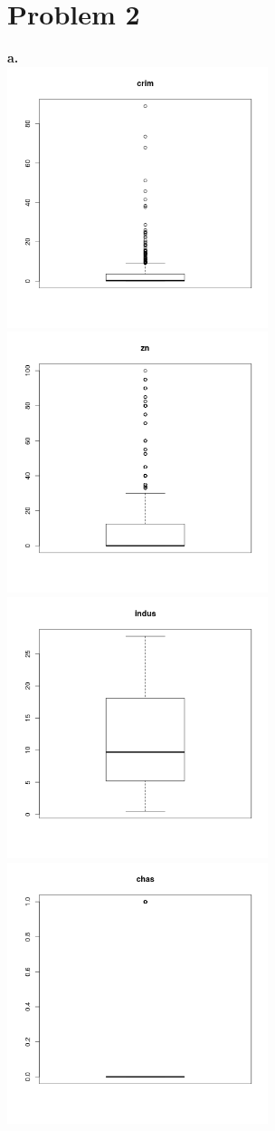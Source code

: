 \message{ !name(hw1.tex)}\documentclass{article}
\begin{document}
\section{Problem 2}
\textbf{a.}\\
\includegraphics[width=3in]{1.png}
\includegraphics[width=3in]{2.png}
\includegraphics[width=3in]{3.png}
\includegraphics[width=3in]{4.png}
\end{document}

